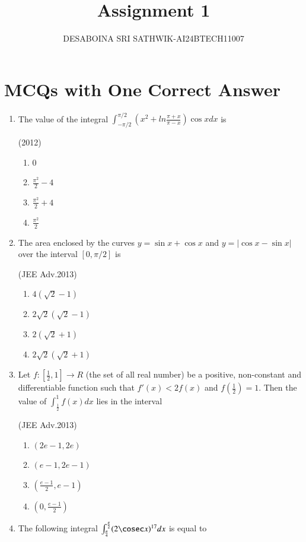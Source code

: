 \documentclass[journal,12pt,twocolumn]{IEEEtran}
\theoremstyle{remark}
\begin{document}

\vspace{3cm}

\title{Assignment 1}
\author{DESABOINA SRI SATHWIK-AI24BTECH11007}
\maketitle
\newpage
\bigskip

\renewcommand{\thefigure}{\theenumi}
\renewcommand{\thetable}{\theenumi}
\section*{MCQs with One Correct Answer}
\begin{enumerate}
\item
The value of the integral $\int_{-\pi/2}^{\pi/2}(x^2+ln\frac{\pi+x}{\pi-x})\cos xdx$ is

	\hfill{(2012)}
\begin{enumerate}[label=(\alph*)]
        \item 0
        \item $\frac{\pi^2}{2}-4$
        \item $\frac{\pi^2}{2}+4$
        \item $\frac{\pi^2}{2}$
\end{enumerate}
\item
The area enclosed by the curves $y=\sin x+\cos x$ and $y=|\cos x-\sin x|$ over the interval $[0,\pi/2]$ is

		\hfill{(JEE Adv.2013)}
		\begin{enumerate}[label=(\alph*)]
			\item $4(\sqrt{2}-1)$
			\item $2\sqrt{2}(\sqrt{2}-1)$
			\item $2(\sqrt{2}+1)$
			\item $2\sqrt{2}(\sqrt{2}+1)$
		\end{enumerate}
	\item
		Let $f:[\frac{1}{2},1]\rightarrow R$ (the set of all real number) be a positive, non-constant and differentiable function such that $f'(x)<2f(x)$ and $f(\frac{1}{2})=1$. Then the value of $\int_{\frac{1}{2}}^{1}f(x) dx $ lies in the interval  

		\hfill{(JEE Adv.2013)}
		\begin{enumerate}[label=(\alph*)]
			\item $(2e-1,2e)$
			\item $(e-1,2e-1)$
			\item $(\frac{e-1}{2},e-1)$
			\item $(0,\frac{e-1}{2})$
		\end{enumerate}
	\item
		The following integral $\int_{\frac{\pi}{4}}^{\frac{\pi}{2}}(2\cosec x)^{17}dx$ is equal to


\end{enumerate}
\end{document}
